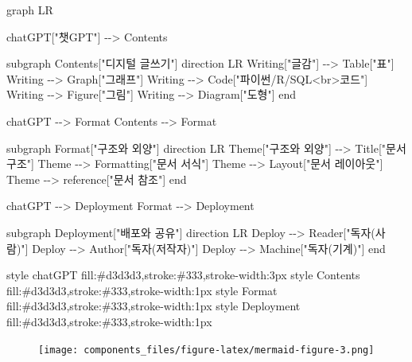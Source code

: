 \documentclass[
  letterpaper,
]{book}
\newenvironment{Shaded}{\begin{snugshade}}{\end{snugshade}}
\newcommand{\NormalTok}[1]{\textcolor[rgb]{0.00,0.23,0.31}{#1}}
\begin{document}
\begin{Shaded}
\begin{Highlighting}[]
\NormalTok{graph LR}

\NormalTok{    chatGPT["챗GPT"] {-}{-}\textgreater{} Contents}

\NormalTok{    subgraph Contents["디지털 글쓰기"]}
\NormalTok{        direction LR}
\NormalTok{        Writing["글감"] {-}{-}\textgreater{} Table["표"]}
\NormalTok{        Writing {-}{-}\textgreater{} Graph["그래프"]}
\NormalTok{        Writing {-}{-}\textgreater{} Code["파이썬/R/SQL\textless{}br\textgreater{}코드"]}
\NormalTok{        Writing {-}{-}\textgreater{} Figure["그림"]}
\NormalTok{        Writing {-}{-}\textgreater{} Diagram["도형"]        }
\NormalTok{    end}

\NormalTok{    chatGPT {-}{-}\textgreater{} Format}
\NormalTok{    Contents {-}{-}\textgreater{} Format}

\NormalTok{    subgraph Format["구조와 외양"]}
\NormalTok{        direction LR}
\NormalTok{        Theme["구조와 외양"] {-}{-}\textgreater{} Title["문서 구조"]}
\NormalTok{        Theme               {-}{-}\textgreater{} Formatting["문서 서식"]}
\NormalTok{        Theme               {-}{-}\textgreater{} Layout["문서 레이아웃"]}
\NormalTok{        Theme               {-}{-}\textgreater{} reference["문서 참조"]}
\NormalTok{    end}

\NormalTok{    chatGPT {-}{-}\textgreater{} Deployment}
\NormalTok{    Format {-}{-}\textgreater{} Deployment}

\NormalTok{    subgraph Deployment["배포와 공유"]}
\NormalTok{        direction LR}
\NormalTok{        Deploy {-}{-}\textgreater{} Reader["독자(사람)"]}
\NormalTok{        Deploy {-}{-}\textgreater{} Author["독자(저작자)"]}
\NormalTok{        Deploy {-}{-}\textgreater{} Machine["독자(기계)"]}
\NormalTok{    end}

\NormalTok{    style chatGPT fill:\#d3d3d3,stroke:\#333,stroke{-}width:3px}
\NormalTok{    style Contents fill:\#d3d3d3,stroke:\#333,stroke{-}width:1px}
\NormalTok{    style Format fill:\#d3d3d3,stroke:\#333,stroke{-}width:1px}
\NormalTok{    style Deployment fill:\#d3d3d3,stroke:\#333,stroke{-}width:1px}
\end{Highlighting}
\end{Shaded}

\begin{figure}[H]

{\centering \texttt{[image: components\_files/figure-latex/mermaid-figure-3.png]}

}

\end{figure}
\end{document}
